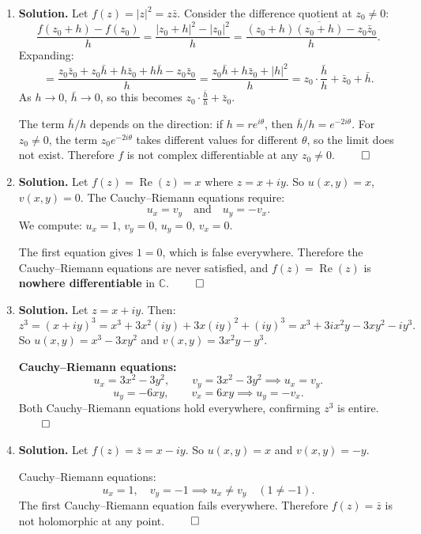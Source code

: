 \begin{enumerate}
\item \textbf{Solution.}
Let $f(z) = |z|^2 = z\bar{z}$. Consider the difference quotient at $z_0 \neq 0$:
\[
\frac{f(z_0 + h) - f(z_0)}{h} = \frac{|z_0 + h|^2 - |z_0|^2}{h} = \frac{(z_0 + h)\overline{(z_0 + h)} - z_0 \bar{z}_0}{h}.
\]
Expanding:
\[
= \frac{z_0 \bar{z}_0 + z_0 \bar{h} + h\bar{z}_0 + h\bar{h} - z_0\bar{z}_0}{h} = \frac{z_0 \bar{h} + h\bar{z}_0 + |h|^2}{h} = z_0 \cdot \frac{\bar{h}}{h} + \bar{z}_0 + \bar{h}.
\]
As $h \to 0$, $\bar{h} \to 0$, so this becomes $z_0 \cdot \frac{\bar{h}}{h} + \bar{z}_0$.

The term $\bar{h}/h$ depends on the direction: if $h = re^{i\theta}$, then $\bar{h}/h = e^{-2i\theta}$. For $z_0 \neq 0$, the term $z_0 e^{-2i\theta}$ takes different values for different $\theta$, so the limit does not exist. Therefore $f$ is not complex differentiable at any $z_0 \neq 0$. $\qed$

\item \textbf{Solution.}
Let $f(z) = \operatorname{Re}(z) = x$ where $z = x + iy$. So $u(x,y) = x$, $v(x,y) = 0$. The Cauchy--Riemann equations require:
\[
u_x = v_y \quad \text{and} \quad u_y = -v_x.
\]
We compute: $u_x = 1$, $v_y = 0$, $u_y = 0$, $v_x = 0$.

The first equation gives $1 = 0$, which is false everywhere. Therefore the Cauchy--Riemann equations are never satisfied, and $f(z) = \operatorname{Re}(z)$ is \textbf{nowhere differentiable} in $\mathbb{C}$. $\qed$

\item \textbf{Solution.}
Let $z = x + iy$. Then:
\[
z^3 = (x+iy)^3 = x^3 + 3x^2(iy) + 3x(iy)^2 + (iy)^3 = x^3 + 3ix^2 y - 3xy^2 - iy^3.
\]
So $u(x,y) = x^3 - 3xy^2$ and $v(x,y) = 3x^2 y - y^3$.

\textbf{Cauchy--Riemann equations:}
\[
u_x = 3x^2 - 3y^2, \qquad v_y = 3x^2 - 3y^2 \implies u_x = v_y.\]
\[
u_y = -6xy, \qquad v_x = 6xy \implies u_y = -v_x.\]
Both Cauchy--Riemann equations hold everywhere, confirming $z^3$ is entire. $\qed$

\item \textbf{Solution.}
Let $f(z) = \bar{z} = x - iy$. So $u(x,y) = x$ and $v(x,y) = -y$.

Cauchy--Riemann equations:
\[
u_x = 1, \quad v_y = -1 \implies u_x \neq v_y \quad (1 \neq -1).
\]
The first Cauchy--Riemann equation fails everywhere. Therefore $f(z) = \bar{z}$ is not holomorphic at any point. $\qed$


\end{enumerate}

